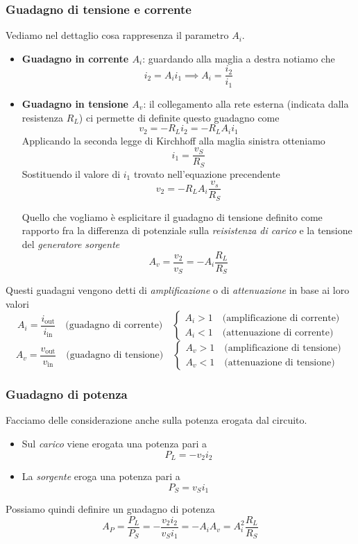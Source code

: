 \subsubsection{Guadagno di tensione e corrente}\label{sec:guadagno_di_tensione_e_corrente} %
Vediamo nel dettaglio cosa rappresenza il parametro $A_i$.
\begin{itemize}
    \item \textbf{Guadagno in corrente $A_i$}: guardando alla maglia a destra notiamo che
        \[
            i_2 = A_i i_1 \implies A_i = \frac{i_2}{i_1}
        \]
    \item \textbf{Guadagno in tensione $A_v$}: il collegamento alla rete esterna (indicata dalla
        resistenza $R_L$) ci permette di definite questo guadagno come
        \[
            v_2 = -R_L i_2 = -R_L A_i i_1 
        \]
        Applicando la seconda legge di Kirchhoff alla maglia sinistra otteniamo
        \[
            i_1 = \frac{v_S}{R_S}
        \]
        Sostituendo il valore di $i_1$ trovato nell'equazione precendente 
        \[
            v_2 = -R_L A_i \frac{v_s}{R_S}
        \]

        Quello che vogliamo è esplicitare il guadagno di tensione definito come rapporto
        fra la differenza di potenziale sulla \textit{reisistenza di carico} e la tensione del \textit{generatore sorgente}
        \[
            A_v = \frac{v_2}{v_S} = -A_i\frac{R_L}{R_S}
        \]
\end{itemize}
Questi guadagni vengono detti di \textit{amplificazione} o di \textit{attenuazione} in base ai loro valori
$$
    A_i = \frac{i_\mathrm{out}}{i_\mathrm{in}} \quad \text{(guadagno di corrente)} \quad
    \begin{cases}
        A_i > 1 \quad \text{(amplificazione di corrente)} \\
        A_i < 1 \quad \text{(attenuazione di corrente)}
    \end{cases}
    $$
    \[
    A_v = \frac{v_\mathrm{out}}{v_\mathrm{in}} \quad \text{(guadagno di tensione)} \quad
    \begin{cases}
        A_v > 1 \quad \text{(amplificazione di tensione)} \\
        A_v < 1 \quad \text{(attenuazione di tensione)}
    \end{cases}
    \]
\subsubsection{Guadagno di potenza}\label{sec:guadagno_di_potenza} %
Facciamo delle considerazione anche sulla potenza erogata dal circuito. 
\begin{itemize}
    \item Sul \textit{carico} viene erogata una potenza pari a 
        \[
            P_L = -v_2 i_2
        \]
    \item La \textit{sorgente} eroga una potenza pari a 
        \[
            P_S = v_S i_1
        \]
\end{itemize}
Possiamo quindi definire un guadagno di potenza 
\[
    A_P = \frac{P_L}{P_S} = - \frac{v_2 i_2}{v_S i_1} = -A_i A_v = A_i^2\frac{R_L}{R_S}
\]

